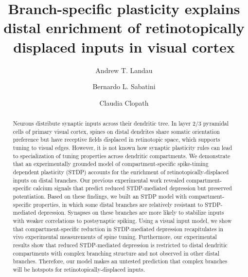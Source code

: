 \documentclass[twocolumn]{theme/bioRxiv}
\begin{document}
 \newpage {}

\title{Branch-specific plasticity explains distal enrichment of retinotopically displaced inputs in visual cortex}

\author[1,\Letter]{Andrew T. Landau }
\author[2]{Bernardo L. Sabatini }
\author[3]{Claudia Clopath }
\date{}

\maketitle

\begin{abstract}
Neurons distribute synaptic inputs across their dendritic tree. In layer 2/3 pyramidal cells of primary visual cortex, spines on distal dendrites share somatic orientation preference but have receptive fields displaced in retinotopic space, which supports tuning to visual edges. However, it is not known how synaptic plasticity rules can lead to specialization of tuning properties across dendritic compartments. We demonstrate that an experimentally grounded model of compartment-specific spike-timing dependent plasticity (STDP) accounts for the enrichment of retinotopically-displaced inputs on distal branches. Our previous experimental work revealed compartment-specific calcium signals that predict reduced STDP-mediated depression but preserved potentiation. Based on these findings, we built an STDP model with compartment-specific properties, in which some distal branches are relatively resistant to STDP-mediated depression. Synapses on these branches are more likely to stabilize inputs with weaker correlations to postsynaptic spiking. Using a visual input model, we show that compartment-specific reduction in STDP-mediated depression recapitulates in vivo experimental measurements of spine tuning. Furthermore, our experimental results show that reduced STDP-mediated depression is restricted to distal dendritic compartments with complex branching structure and not observed in other distal branches. Therefore, our model makes an untested prediction that complex branches will be hotspots for retinotopically-displaced inputs. 
\end{abstract}
\end{document}
